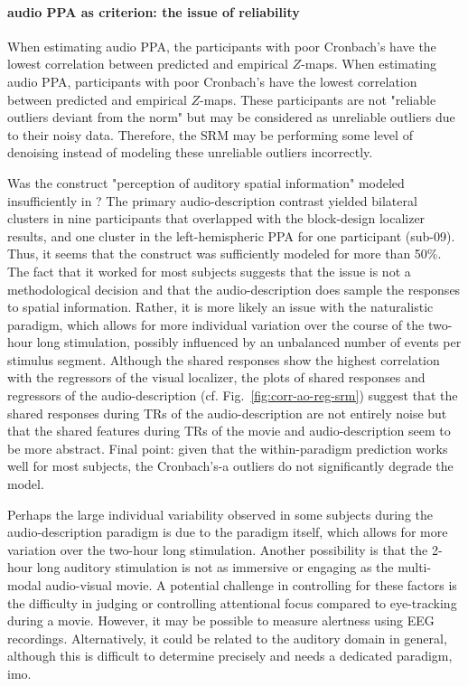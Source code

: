 \paragraph{audio PPA as criterion: the issue of reliability}



%
When estimating audio PPA, the participants with poor Cronbach's have the lowest
correlation between predicted and empirical $Z$-maps.
%
When estimating audio PPA, participants with poor Cronbach's have the lowest
correlation between predicted and empirical $Z$-maps.
%
These participants are not "reliable outliers deviant from the norm" but may be
considered as unreliable outliers due to their noisy data.
%
Therefore, the SRM may be performing some level of denoising instead of modeling
these unreliable outliers incorrectly.

%
Was the construct "perception of auditory spatial information" modeled
insufficiently in \citet{haeusler2022processing}?
%
The primary audio-description contrast yielded bilateral clusters in nine
participants that overlapped with the block-design localizer results, and one
cluster in the left-hemispheric PPA for one participant (sub-09). Thus, it seems
that the construct was sufficiently modeled for more than 50\%.
%
The fact that it worked for most subjects suggests that the issue is not a
methodological decision and that the audio-description does sample the responses
to spatial information.
%
Rather, it is more likely an issue with the naturalistic paradigm, which allows
for more individual variation over the course of the two-hour long stimulation,
possibly influenced by an unbalanced number of events per stimulus segment.
%
Although the shared responses show the highest correlation with the regressors
of the visual localizer, the plots of shared responses and regressors of the
audio-description (cf. Fig.~\ref{fig:corr-ao-reg-srm}) suggest that the shared
responses during TRs of the audio-description are not entirely noise but that
the shared features during TRs of the movie and audio-description seem to be
more abstract.
%
Final point: given that the within-paradigm prediction works well for most
subjects, the Cronbach's-a outliers do not significantly degrade the model.

%
Perhaps the large individual variability observed in some subjects during the
audio-description paradigm is due to the paradigm itself, which allows for more
variation over the two-hour long stimulation.
%
Another possibility is that the 2-hour long auditory stimulation is not as
immersive or engaging as the multi-modal audio-visual movie.
%
A potential challenge in controlling for these factors is the difficulty in
judging or controlling attentional focus compared to eye-tracking during a
movie.
%
However, it may be possible to measure alertness using EEG recordings.
%
Alternatively, it could be related to the auditory domain in general, although
this is difficult to determine precisely and needs a dedicated paradigm, imo.


